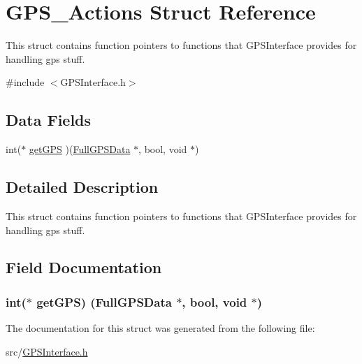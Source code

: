 \hypertarget{struct_g_p_s___actions}{}\section{G\+P\+S\+\_\+\+Actions Struct Reference}
\label{struct_g_p_s___actions}


This struct contains function pointers to functions that G\+P\+S\+Interface provides for handling gps stuff.  




{\ttfamily \#include $<$G\+P\+S\+Interface.\+h$>$}

\subsection*{Data Fields}
\begin{DoxyCompactItemize}
\item 
int($\ast$ \hyperlink{struct_g_p_s___actions_a5dd8131dc7f60bbfd44b89c1d29090b9}{get\+G\+PS} )(\hyperlink{struct_full_g_p_s_data}{Full\+G\+P\+S\+Data} $\ast$, bool, void $\ast$)
\end{DoxyCompactItemize}


\subsection{Detailed Description}
This struct contains function pointers to functions that G\+P\+S\+Interface provides for handling gps stuff. 

\subsection{Field Documentation}
\subsubsection[{\texorpdfstring{get\+G\+PS}{getGPS}}]{\setlength{\rightskip}{0pt plus 5cm}int($\ast$ get\+G\+PS) ({\bf Full\+G\+P\+S\+Data} $\ast$, bool, void $\ast$)}\hypertarget{struct_g_p_s___actions_a5dd8131dc7f60bbfd44b89c1d29090b9}{}\label{struct_g_p_s___actions_a5dd8131dc7f60bbfd44b89c1d29090b9}


The documentation for this struct was generated from the following file\+:\begin{DoxyCompactItemize}
\item 
src/\hyperlink{_g_p_s_interface_8h}{G\+P\+S\+Interface.\+h}\end{DoxyCompactItemize}
